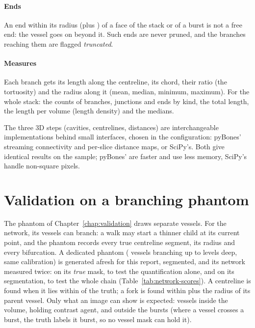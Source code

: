 \paragraph{Ends} An end within its radius (plus \pbValueNetAnchorMargin\um) of a face of the stack or of a
burst is not a free end: the vessel goes on beyond it. Such ends are never pruned, and the branches
reaching them are flagged \emph{truncated}.

\paragraph{Measures} Each branch gets its length along the centreline, its chord, their ratio (the
tortuosity) and the radius along it (mean, median, minimum, maximum). For the whole stack: the counts
of branches, junctions and ends by kind, the total length, the length per volume (length density) and
the medians.

The three 3D steps (cavities, centrelines, distances) are interchangeable implementations behind
small interfaces, chosen in the configuration: pyBones' streaming connectivity and per-slice distance
maps, or SciPy's. Both give identical results on the sample; pyBones' are faster and use less memory,
SciPy's handle non-square pixels.

\section{Validation on a branching phantom}

The phantom of Chapter~\ref{chap:validation} draws separate vessels. For the network, its vessels can
branch: a walk may start a thinner child at its current point, and the phantom records every true
centreline segment, its radius and every bifurcation. A dedicated phantom (\pbValueNetPhantomVessels{} vessels branching up to
\pbValueNetPhantomDepth{} levels deep, same calibration) is generated afresh for this report, segmented, and its network
measured twice: on its \emph{true} mask, to test the quantification alone, and on its segmentation,
to test the whole chain (Table~\ref{tab:network-scores}). A centreline is found when it lies within
\pbValueNetTolerance\um{} of the truth; a fork is found within \pbValueNetJunctionTolerance\um{} plus the radius of
its parent vessel. Only what an image can show is expected: vessels inside the volume, holding
contrast agent, and outside the bursts (where a vessel crosses a burst, the truth labels it burst, so
no vessel mask can hold it).


